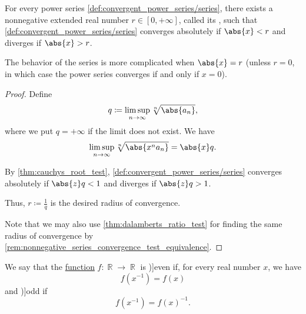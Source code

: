 \begin{theorem}\label{thm:power_series_radius_of_convergence}
  For every power series \eqref{def:convergent_power_series/series}, there exists a nonnegative extended real number \( r \in [0, +\infty] \), called its , such that \eqref{def:convergent_power_series/series} converges absolutely if \( \abs{x} < r \) and diverges if \( \abs{x} > r \).

  The behavior of the series is more complicated when \( \abs{x} = r \) (unless \( r = 0 \), in which case the power series converges if and only if \( x = 0 \)).
\end{theorem}
\begin{proof}
  Define
  \begin{equation*}
    q \coloneqq \limsup_{n \to \infty} \sqrt[n]{\abs{a_n}},
  \end{equation*}
  where we put \( q = +\infty \) if the limit does not exist. We have
  \begin{equation*}
    \limsup_{n \to \infty} \sqrt[n]{\abs{x^n a_n}} = \abs{x} q.
  \end{equation*}

  By \cref{thm:cauchys_root_test}, \eqref{def:convergent_power_series/series} converges absolutely if \( \abs{z} q < 1 \) and diverges if \( \abs{z} q > 1 \).

  Thus, \( r \coloneqq \tfrac 1 q \) is the desired radius of convergence.

  Note that we may also use \cref{thm:dalamberts_ratio_test} for finding the same radius of convergence by \cref{rem:nonnegative_series_convergence_test_equivalence}.
\end{proof}

\begin{definition}\label{def:real_function_parity}
  We say that the \hyperref[def:function]{function} \( f: \BbbR \to \BbbR \) is \term[ru=чётная (функция), en=even (function) (\cite[170]{Carothers2000RealAnalysis})]{even} if, for every real number \( x \), we have
  \begin{equation}\label{eq:def:real_function_parity/even}
    f(x^{-1}) = f(x)
  \end{equation}
  and \term[ru=нечётная (функция), en=odd (function) (\cite[170]{Carothers2000RealAnalysis})]{odd} if
  \begin{equation}\label{eq:def:real_function_parity/odd}
    f(x^{-1}) = f(x)^{-1}.
  \end{equation}
\end{definition}

